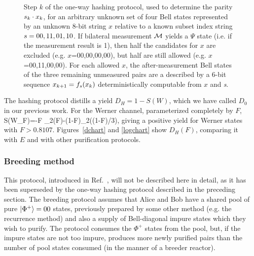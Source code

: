 \begin{figure}[htbp]
\centerline{}
\caption[Step k of one-way hashing]{Step $k$ of the one-way hashing protocol, used to determine
the parity ${\sl s}_k\cdot x_k$, for an arbitrary unknown set of four
Bell states represented by an unknown 8-bit string $x$ relative to a
known subset index string ${\sl s}={\sl 00,11,01,10}$.  If bilateral
measurement $\cal M$ yields a $\Psi$ state (i.e. if the
measurement result is 1), then half the candidates for $x$ are
excluded (e.g. $x$=00,00,00,00), but half are still allowed (e.g.
$x$=00,11,00,00). For each allowed $x$, the after-measurement Bell
states of the three remaining unmeasured pairs are a described by a
6-bit sequence $x_{k+1}=f_{\sl s}(x_k)$ deterministically computable
from $x$ and {\sl s}.
\label{figure10}}
\end{figure}
 
The hashing protocol distills a yield $D_H=1\!-\!S(W)$, which we have called
$D_0$ in our previous work\cite{purification}.  For the
Werner channel, parameterized completely by $F$,
\beq
S(W_F)=-F \log_2(F)-(1\!-\!F)\log_2((1\!-\!F)/3),
\eeq
giving a positive yield for Werner states with $F>0.8107$.  
Figures~\ref{dchart} and \ref{logchart} show $D_H(F)$, comparing it with
$E$ and with other purification protocols.
 
\subsubsection{Breeding method}
\label{breeding}
 
This protocol, introduced in Ref.~\cite{purification}, will not be
described here in detail, as it has been superseded by the one-way
hashing protocol described in the preceding section.  The breeding
protocol assumes that Alice and Bob have a shared pool of pure
$| \Phi^+ \rangle=00$ states, previously prepared by some other method
(e.g. the recurrence method) and also a supply of Bell-diagonal impure
states which they wish to purify.  The protocol consumes the $\Phi^+$
states from the pool, but, if the impure states are not too impure,
produces more newly purified pairs than the number of pool states
consumed (in the manner of a breeder reactor).
 
